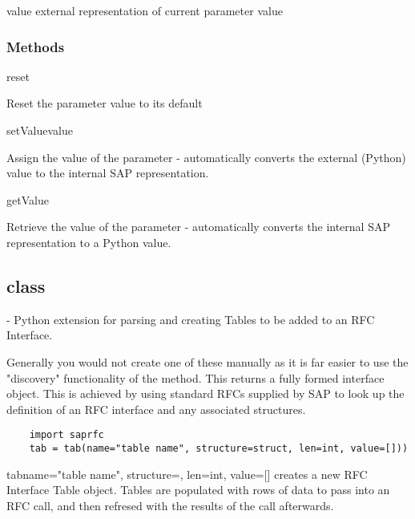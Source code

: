\documentclass{howto}
\begin{document}
\begin{memberdesc}[parm]{value}
     external representation of current parameter value
\end{memberdesc}


\subsubsection{Methods \label{parmmeths}}

\begin{methoddesc}[parm]{reset}{}

Reset the parameter value to its default

\end{methoddesc}


\begin{methoddesc}[parm]{setValue}{value}

Assign the value of the parameter - automatically converts the external (Python) value to the 
internal SAP representation.

\end{methoddesc}


\begin{methoddesc}[parm]{getValue}{}

Retrieve the value of the parameter - automatically converts the internal SAP representation to a Python value.

\end{methoddesc}


\subsection{class  \label{classtab}}

 - Python extension for parsing and creating Tables to be added to an RFC Interface.

Generally you would not create one of these manually as it is far easier to use the "discovery" functionality of the  method.  This returns a fully formed interface object.  This is achieved by using standard RFCs supplied by SAP to look up the definition of an RFC interface and any associated structures.

\begin{verbatim}
	import saprfc
  	tab = tab(name="table name", structure=struct, len=int, value=[]))
\end{verbatim}


\begin{funcdesc}{tab}{name="table name", structure=, len=int, value=[]}
creates a new RFC Interface Table object.  Tables are populated with rows of data to pass into an
RFC call, and then refresed with the results of the call afterwards.
\end{funcdesc}
\end{document}
